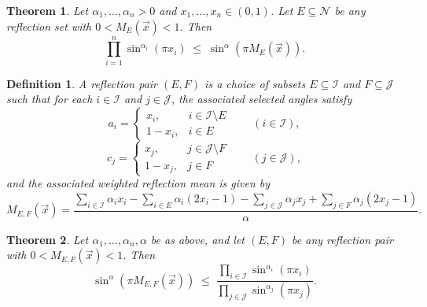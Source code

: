 \documentclass[10pt,a4paper]{amsart}
\newtheorem{theorem}{Theorem}
\newtheorem{definition}{Definition}
\begin{document}
\begin{theorem}\label{thm:upper-main}
Let $\alpha_1,\ldots,\alpha_n > 0$ and $x_1,\ldots,x_n \in (0,1)$. Let
$E \subseteq \mathcal N$ be any reflection set with $0 < M_E(\vec x) < 1$. Then
\begin{equation}\label{eq:upperbound}
\prod_{i=1}^{n} \sin^{\alpha_i}(\pi x_i) \;\leq\; \sin^{\alpha}(\pi M_E(\vec x)).
\end{equation}
\end{theorem}

\begin{definition}\label{def:lower-reflection}
A \emph{reflection pair} $(E,F)$ is a choice of subsets $E \subseteq \mathcal I$ and
$F\subseteq\mathcal J$ such that for each $i\in \mathcal I$ and $j\in\mathcal J$, the associated selected angles satisfy
\[
a_i = \begin{cases} x_i, & i\in\mathcal I\setminus E\\ 1-x_i, & i\in E\end{cases}
\qquad (i\in\mathcal I),
\]
\[
c_j = \begin{cases} x_j, & j\in\mathcal J\setminus F\\ 1-x_j, & j\in F\end{cases}
\qquad (j\in\mathcal J),
\]
and the associated weighted reflection mean is given by
\begin{equation}\label{eq:MEFdef}
M_{E,F}(\vec x) = \frac{\displaystyle\sum_{i\in\mathcal I}\alpha_i x_i - \sum_{i\in E}\alpha_i(2x_i-1)
- \sum_{j\in\mathcal J}\alpha_j x_j + \sum_{j\in F}\alpha_j(2x_j-1)}{\alpha}.
\end{equation}
\end{definition}

\begin{theorem}\label{thm:lower-main}
Let $\alpha_1,\ldots,\alpha_n,\alpha$ be as above, and let $(E,F)$ be any reflection pair
with $0<M_{E,F}(\vec x)<1$. Then
\begin{equation}\label{eq:genineq}
\sin^{\alpha}\!\left(\pi M_{E,F}(\vec x)\right)
\;\leq\;
\frac{\displaystyle\prod_{i\in\mathcal I} \sin^{\alpha_i}(\pi x_i)}
     {\displaystyle\prod_{j\in\mathcal J} \sin^{\alpha_j}(\pi x_j)}.
\end{equation}
\end{theorem}
\end{document}
